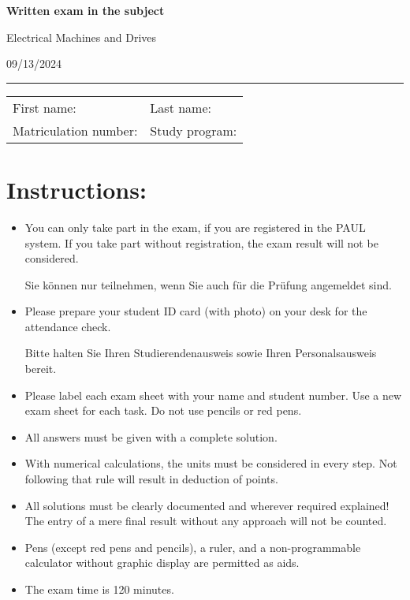 \begin{center}

    {\vspace{3mm}\Large \textbf{
    \textsf{Written exam in the subject}}
    \vspace{3mm}
    
    \LARGE
    \textsf{Electrical Machines and Drives}
    
    \vspace{6mm}
    \large
    
    09/13/2024
    \vspace{5mm}
    }
    
    
    \end{center}
    
    \hrule
    
    
    \vspace{5mm}
    
    \begin{tabular}{ll}
    First name:  \qquad \qquad \qquad  \qquad \qquad\qquad \qquad \qquad & Last name: \\[1cm]
     Matriculation number: & Study program:
    \end{tabular}

    \section*{Instructions:}
\begin{itemize}
\item You can only take part in the exam, if you are registered in the PAUL system. If you take part without registration, the exam result will not be considered. \newline
\begin{germanblock}
    Sie können nur teilnehmen, wenn Sie auch für die Prüfung angemeldet sind.
\end{germanblock}
\item Please prepare your student ID card (with photo) on your desk for the attendance check.
\begin{germanblock}
    Bitte halten Sie Ihren Studierendenausweis sowie Ihren Personalsausweis bereit.
\end{germanblock}
\item Please label each exam sheet with your name and student number. Use a new exam sheet for each task. Do not use pencils or red pens.
\item All answers must be given with a complete solution.
\item With numerical calculations, the units must be considered in every step. Not following that rule will result in deduction of points. 
\item All solutions must be clearly documented and wherever required explained! The entry of a mere final result without any approach will not be counted.
\item Pens (except red pens and pencils), a ruler, and a non-programmable calculator without graphic display are permitted as aids.
\item The exam time is 120 minutes. 
\end{itemize}

